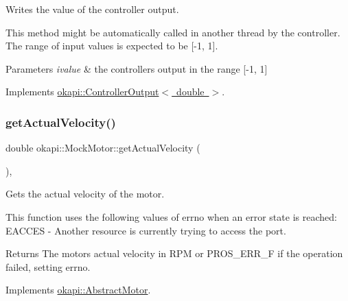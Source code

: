 Writes the value of the controller output. 

This method might be automatically called in another thread by the controller. The range of input values is expected to be \mbox{[}-\/1, 1\mbox{]}.


\begin{DoxyParams}{Parameters}
{\em ivalue} & the controller\textquotesingle{}s output in the range \mbox{[}-\/1, 1\mbox{]} \\
\hline
\end{DoxyParams}


Implements \mbox{\hyperlink{classokapi_1_1ControllerOutput_a360c08f0c10b36f882d6d3100c2cad49}{okapi\+::\+Controller\+Output$<$ double $>$}}.

\mbox{\label{classokapi_1_1MockMotor_a774e4436ae386aee9981c11ccd947e13}} 
\subsubsection{\texorpdfstring{getActualVelocity()}{getActualVelocity()}}
{\footnotesize\ttfamily double okapi\+::\+Mock\+Motor\+::get\+Actual\+Velocity (\begin{DoxyParamCaption}{ }\end{DoxyParamCaption})\hspace{0.3cm}{\ttfamily [override]}, {\ttfamily [virtual]}}



Gets the actual velocity of the motor. 

This function uses the following values of errno when an error state is reached\+: E\+A\+C\+C\+ES -\/ Another resource is currently trying to access the port.

\begin{DoxyReturn}{Returns}
The motor\textquotesingle{}s actual velocity in R\+PM or P\+R\+O\+S\+\_\+\+E\+R\+R\+\_\+F if the operation failed, setting errno. 
\end{DoxyReturn}


Implements \mbox{\hyperlink{classokapi_1_1AbstractMotor_a45b2013cc318577fad4ac38ad22ce219}{okapi\+::\+Abstract\+Motor}}.

\mbox{\label{classokapi_1_1MockMotor_a5c545e42aff91b29c48b81d64f625c9a}} 

